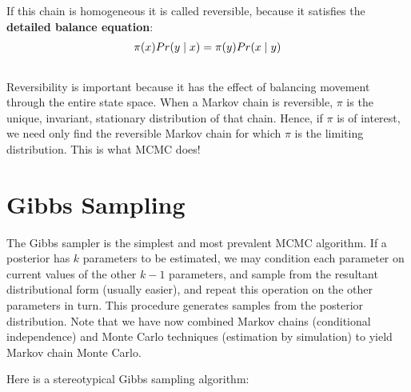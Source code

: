 \documentclass[letterpaper,10pt,english]{sphinxmanual}
\begin{document}
If this chain is homogeneous it is called reversible, because it satisfies the
\textbf{detailed balance equation}:
\begin{gather}
\begin{split}\pi(x)Pr(y \mid x) = \pi(y) Pr(x \mid y)\end{split}\notag\\\begin{split}\end{split}\notag
\end{gather}
Reversibility is important because it has the effect of balancing movement
through the entire state space. When a Markov chain is reversible, $\pi$
is the unique, invariant, stationary distribution of that chain. Hence, if
$\pi$ is of interest, we need only find the reversible Markov chain for
which $\pi$ is the limiting distribution. This is what MCMC does!


\section{Gibbs Sampling}
\label{theory:gibbs-sampling}
The Gibbs sampler is the simplest and most prevalent MCMC algorithm. If a
posterior has $k$ parameters to be estimated, we may condition each
parameter on current values of the other $k-1$ parameters, and sample from
the resultant distributional form (usually easier), and repeat this operation on
the other parameters in turn. This procedure generates samples from the
posterior distribution. Note that we have now combined Markov chains
(conditional independence) and Monte Carlo techniques (estimation by simulation)
to yield Markov chain Monte Carlo.

Here is a stereotypical Gibbs sampling algorithm:
\end{document}
